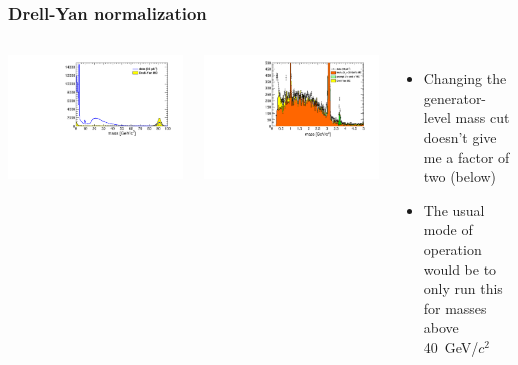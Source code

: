 \documentclass[compress]{beamer}
\begin{document}
\begin{frame}
\frametitle{Drell-Yan normalization}

\begin{columns}
\includegraphics[width=\linewidth]{normalizing_to_the_z_naive.pdf}

\includegraphics[width=\linewidth]{lowdimuon_mass_nobcuts_naive.pdf}

\begin{itemize}
\item Changing the generator-level mass cut doesn't give me a factor of two (below)
\item The usual mode of operation would be to only run this for masses
  above 40~GeV/$c^2$
\end{itemize}


\end{columns}
\end{frame}
\end{document}
